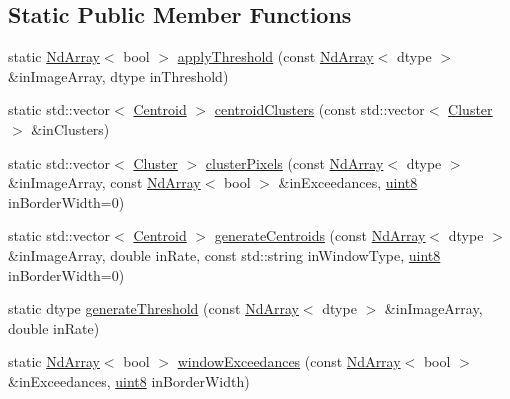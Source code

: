 \subsection*{Static Public Member Functions}
\begin{DoxyCompactItemize}
\item 
static \mbox{\hyperlink{class_num_cpp_1_1_nd_array}{Nd\+Array}}$<$ bool $>$ \mbox{\hyperlink{class_num_cpp_1_1_image_processing_a1dc18ba020a8414266f4e86e0643891d}{apply\+Threshold}} (const \mbox{\hyperlink{class_num_cpp_1_1_nd_array}{Nd\+Array}}$<$ dtype $>$ \&in\+Image\+Array, dtype in\+Threshold)
\item 
static std\+::vector$<$ \mbox{\hyperlink{class_num_cpp_1_1_image_processing_1_1_centroid}{Centroid}} $>$ \mbox{\hyperlink{class_num_cpp_1_1_image_processing_a0bbb3a42b99182e1efdae02dec778832}{centroid\+Clusters}} (const std\+::vector$<$ \mbox{\hyperlink{class_num_cpp_1_1_image_processing_1_1_cluster}{Cluster}} $>$ \&in\+Clusters)
\item 
static std\+::vector$<$ \mbox{\hyperlink{class_num_cpp_1_1_image_processing_1_1_cluster}{Cluster}} $>$ \mbox{\hyperlink{class_num_cpp_1_1_image_processing_a80a0f16582065c68c7aa862951ce8cb8}{cluster\+Pixels}} (const \mbox{\hyperlink{class_num_cpp_1_1_nd_array}{Nd\+Array}}$<$ dtype $>$ \&in\+Image\+Array, const \mbox{\hyperlink{class_num_cpp_1_1_nd_array}{Nd\+Array}}$<$ bool $>$ \&in\+Exceedances, \mbox{\hyperlink{namespace_num_cpp_aee396d0469d6031cd18118c0a45bcdda}{uint8}} in\+Border\+Width=0)
\item 
static std\+::vector$<$ \mbox{\hyperlink{class_num_cpp_1_1_image_processing_1_1_centroid}{Centroid}} $>$ \mbox{\hyperlink{class_num_cpp_1_1_image_processing_ac2a11e5f87b28c5e3e68dcb07fcdb16d}{generate\+Centroids}} (const \mbox{\hyperlink{class_num_cpp_1_1_nd_array}{Nd\+Array}}$<$ dtype $>$ \&in\+Image\+Array, double in\+Rate, const std\+::string in\+Window\+Type, \mbox{\hyperlink{namespace_num_cpp_aee396d0469d6031cd18118c0a45bcdda}{uint8}} in\+Border\+Width=0)
\item 
static dtype \mbox{\hyperlink{class_num_cpp_1_1_image_processing_aa11b07d204806bbb23f1188190f428c7}{generate\+Threshold}} (const \mbox{\hyperlink{class_num_cpp_1_1_nd_array}{Nd\+Array}}$<$ dtype $>$ \&in\+Image\+Array, double in\+Rate)
\item 
static \mbox{\hyperlink{class_num_cpp_1_1_nd_array}{Nd\+Array}}$<$ bool $>$ \mbox{\hyperlink{class_num_cpp_1_1_image_processing_aaba0eb493a0962f57ee79997a8166302}{window\+Exceedances}} (const \mbox{\hyperlink{class_num_cpp_1_1_nd_array}{Nd\+Array}}$<$ bool $>$ \&in\+Exceedances, \mbox{\hyperlink{namespace_num_cpp_aee396d0469d6031cd18118c0a45bcdda}{uint8}} in\+Border\+Width)
\end{DoxyCompactItemize}


